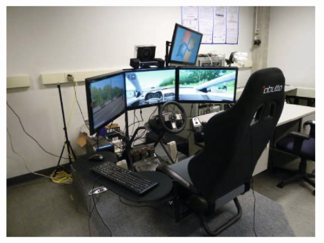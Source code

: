 \documentclass{beamer}
\begin{document}
\begin{frame}
\begin{columns}
\begin{column}{0.25\textwidth}
\begin{center}
					\includegraphics[width=0.9\textwidth]{RanForSim}
				\end{center}
			\end{column}
		\end{columns}
		
	\end{frame}
	
\end{document}
